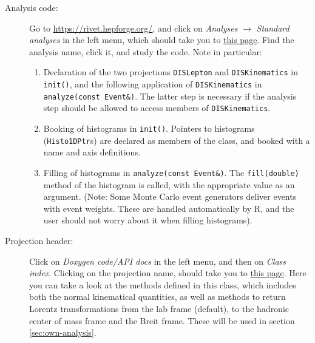 \documentclass[11pt]{article}
\newcommand{\rivet}{R\protect\scalebox{0.8}{IVET}\xspace}
\begin{document}
\begin{description}
	\item[Analysis code: ] Go to \url{https://rivet.hepforge.org/}, and click on \textit{Analyses} $\rightarrow$ \textit{Standard analyses} in the left menu, which should take you to \href{https://rivet.hepforge.org/analyses.html}{this page}. Find the analysis name, click it, and study the code. Note in particular:
		\begin{enumerate}
			\item Declaration of the two projections \texttt{DISLepton} and \texttt{DISKinematics} in \texttt{init()}, and the following application of \texttt{DISKinematics} in \texttt{analyze(const Event\&)}. The latter step is necessary if the analysis step should be allowed to access members of \texttt{DISKinematics}.
			\item Booking of histograms in \texttt{init()}. Pointers to histograms (\texttt{Histo1DPtr}s) are declared as members of the class, and booked with a name and axis definitions.
			\item Filling of histograms in \texttt{analyze(const Event\&)}. The \texttt{fill(double)} method of the histogram is called, with the appropriate value as an argument. (Note: Some Monte Carlo event generators deliver events with event weights. These are handled automatically by \rivet, and the user should not worry about it when filling histograms).
		\end{enumerate}
	\item[Projection header: ] Click on \textit{Doxygen code/API docs} in the left menu, and then on \textit{Class index}. Clicking on the projection name, should take you to \href{https://rivet.hepforge.org/code/dev/classRivet_1_1DISKinematics.html}{this page}. Here you can take a look at the methods defined in this class, which includes both the normal kinematical quantities, as well as methods to return Lorentz transformations from the lab frame (default), to the hadronic center of mass frame and the Breit frame. These will be used in section \ref{sec:own-analysis}.
\end{description}
\end{document}
